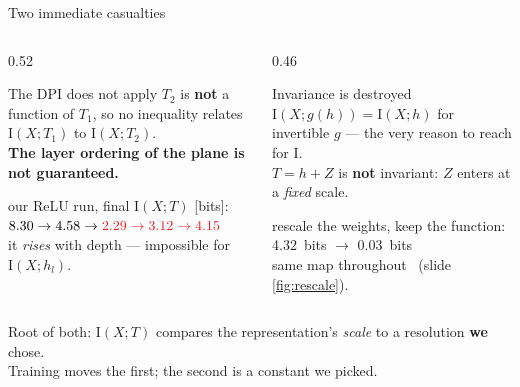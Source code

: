 \documentclass[aspectratio=169,11pt]{beamer}
\newcommand{\I}{\mathrm{I}}
\begin{document}
\begin{frame}{Two immediate casualties}
\begin{center}
\end{center}
\vspace{-4pt}
\begin{columns}[T]
\begin{column}{0.52\textwidth}
\begin{alertblock}{\small The DPI does not apply}
\footnotesize
$T_2$ is \textbf{not} a function of $T_1$, so no inequality relates $\I(X;T_1)$ to
$\I(X;T_2)$.\\[2pt]
\textbf{The layer ordering of the plane is not guaranteed.}
\end{alertblock}
\vspace{-5pt}
{\footnotesize our ReLU run, final $\I(X;T)$ [bits]:}\\[1pt]
\centering
{\small $8.30 \to 4.58 \to
 \textcolor{bad}{2.29 \to 3.12 \to 4.15}$}\\[1pt]
{\footnotesize \textcolor{bad}{it \emph{rises} with depth} --- impossible for $\I(X;h_l)$.}
\end{column}
\begin{column}{0.46\textwidth}
\begin{alertblock}{\small Invariance is destroyed}
\footnotesize
$\I(X;g(h))=\I(X;h)$ for invertible $g$ --- the very reason to reach for $\I$.\\[2pt]
$T=h+Z$ is \textbf{not} invariant: $Z$ enters at a \emph{fixed} scale.
\end{alertblock}
\vspace{-5pt}
\centering
{\footnotesize rescale the weights, keep the function:}\\[1pt]
{\small \SI{4.32}{bits} $\longrightarrow$ \SI{0.03}{bits}}\\[1pt]
{\footnotesize same map throughout \ (slide \ref{fig:rescale}).}
\end{column}
\end{columns}
\vspace{1pt}
\begin{center}\footnotesize
Root of both: $\I(X;T)$ compares the representation's \emph{scale} to a resolution
\textbf{we} chose.\\[1pt]
Training moves the first; the second is a constant we picked.
\end{center}
\end{frame}
\end{document}
